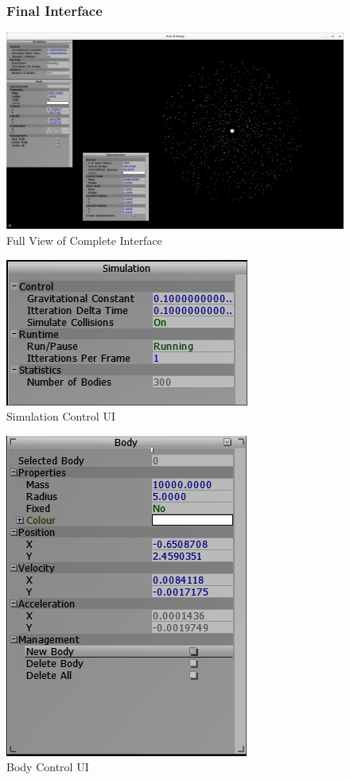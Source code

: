 {\begin{figure}
  \subsubsection{Final Interface}
  \centering
  \includegraphics[width=\textwidth]{../img/finalInterface.png} 
  \caption{Full View of Complete Interface}
\end{figure}
\pagebreak

\begin{figure}[h]
  \centering
  \includegraphics[scale=0.7]{../img/simUI.png} 
  \caption{Simulation Control UI}
\end{figure}

\begin{figure}[h]
  \centering
  \includegraphics[scale=0.6]{../img/bodyUI.png} 
  \caption{Body Control UI}
\end{figure}

}
